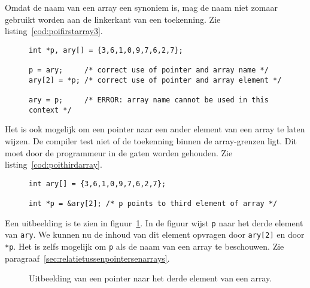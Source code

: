 Omdat de naam van een array een synoniem is, mag de naam niet zomaar gebruikt worden aan de linkerkant van een toekenning. Zie listing~\ref{cod:poifirstarray3}.

\begin{figure}[!ht]
\begin{lstlisting}[caption=Een pointer naar het eerste element van een array.,label=cod:poifirstarray3]
int *p, ary[] = {3,6,1,0,9,7,6,2,7};

p = ary;     /* correct use of pointer and array name */
ary[2] = *p; /* correct use of pointer and array element */

ary = p;     /* ERROR: array name cannot be used in this context */
\end{lstlisting}
\end{figure}

Het is ook mogelijk om een pointer naar een ander element van een array te laten wijzen. De compiler test niet of de toekenning binnen de array-grenzen ligt. Dit moet door de programmeur in de gaten worden gehouden. Zie listing~\ref{cod:poithirdarray}.

\begin{figure}[!ht]
\begin{lstlisting}[caption=Een pointer naar het derde element van een array.,label=cod:poithirdarray]
int ary[] = {3,6,1,0,9,7,6,2,7};

int *p = &ary[2]; /* p points to third element of array */
\end{lstlisting}
\end{figure}

Een uitbeelding is te zien in figuur~\ref{fig:poithirdarray}. In de figuur wijst \texttt{p} naar het derde element van \texttt{ary}. We kunnen nu de inhoud van dit element opvragen door \texttt{ary[2]} en door \texttt{*p}. Het is zelfs mogelijk om \texttt{p} als de naam van een array te beschouwen. Zie paragraaf~\ref{sec:relatietussenpointersenarrays}.

\begin{figure}[!ht]
\centering
{}
\caption{Uitbeelding van een pointer naar het derde element van een array.}
\label{fig:poithirdarray}
\end{figure}

